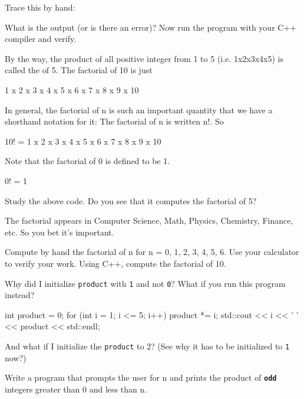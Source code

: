 \begin{ex}
Trace this by hand:
\end{ex}

What is the output (or is there an error)? Now run the program with your
C++ compiler and verify.

By the way, the product of all positive integer from 1 to 5 (i.e.
1x2x3x4x5) is called the  of 5. The factorial of 10 is
just
\begin{center}
1 x 2 x 3 x 4 x 5 x 6 x 7 x 8 x 9 x 10
\end{center}
In general, the factorial of n is such an important quantity that we
have a shorthand notation for it: The factorial of n is written n!. So
\begin{center}
10! = 1 x 2 x 3 x 4 x 5 x 6 x 7 x 8 x 9 x 10
\end{center}
Note that the factorial of 0 is defined to be 1.
\begin{center}
0! = 1
\end{center}
Study the above code. Do you see that it computes the factorial of 5?

The factorial appears in Computer Science, Math, Physics, Chemistry,
Finance, etc. So you bet it's important.

\begin{ex}
Compute by hand the factorial of n for n = 0, 1, 2, 3, 4, 5, 6. Use your calculator to verify your work. Using C++, compute the factorial of 10.
\end{ex}
\begin{ex}
 Why did I initialize \texttt{product} with \texttt{1} and
not \texttt{0}? What if you run this program instead?
\begin{console}
int product = 0;
for (int i = 1; i <= 5; i++)
{   
    product *= i;
    std::cout << i << ' ' << product << std::endl;
}
\end{console}
And what if I initialize the \texttt{product} to 2? (See why it has to be
initialized to \texttt{1} now?)
\end{ex}

\begin{ex}
Write a program that prompts the user for n and
prints the product of \texttt{\textbf{odd}} integers greater than 0 and
less than n.
\end{ex}

